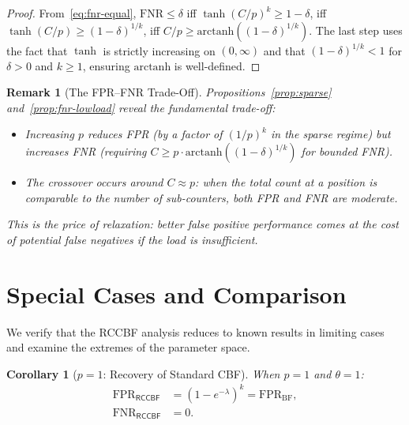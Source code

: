 \documentclass[11pt,a4paper]{article}
\newtheorem{corollary}[theorem]{Corollary}
\newtheorem{remark}[theorem]{Remark}
\newcommand{\RCCBF}{\textsf{RCCBF}}
\newcommand{\FPR}{\mathrm{FPR}}
\newcommand{\FNR}{\mathrm{FNR}}
\begin{document}
\begin{proof}
From~\eqref{eq:fnr-equal}, $\FNR \le \delta$ iff
$\tanh(C/p)^k \ge 1 - \delta$,
iff $\tanh(C/p) \ge (1-\delta)^{1/k}$,
iff $C/p \ge \mathrm{arctanh}((1-\delta)^{1/k})$.
The last step uses the fact that $\tanh$ is strictly increasing on
$(0, \infty)$ and that $(1-\delta)^{1/k} < 1$ for $\delta > 0$ and
$k \ge 1$, ensuring $\mathrm{arctanh}$ is well-defined.
\end{proof}

\begin{remark}[The FPR--FNR Trade-Off]\label{rem:tradeoff}
Propositions~\ref{prop:sparse} and~\ref{prop:fnr-lowload} reveal the
fundamental trade-off:
\begin{itemize}
  \item Increasing $p$ \emph{reduces} FPR (by a factor of $(1/p)^k$ in
        the sparse regime) but \emph{increases} FNR (requiring $C \ge p
        \cdot \mathrm{arctanh}((1-\delta)^{1/k})$ for bounded FNR).
  \item The crossover occurs around $C \approx p$: when the total count at
        a position is comparable to the number of sub-counters, both FPR
        and FNR are moderate.
\end{itemize}
This is the price of relaxation: better false positive performance comes at
the cost of potential false negatives if the load is insufficient.
\end{remark}

\section{Special Cases and Comparison}\label{sec:special}

We verify that the \RCCBF{} analysis reduces to known results in limiting
cases and examine the extremes of the parameter space.

\begin{corollary}[$p = 1$: Recovery of Standard CBF]\label{cor:p1}
When $p = 1$ and $\theta = 1$:
\begin{align}
  \FPR_{\RCCBF} &= (1 - e^{-\lambda})^k = \FPR_{\mathrm{BF}},
  \label{eq:fpr-p1} \\
  \FNR_{\RCCBF} &= 0. \label{eq:fnr-p1}
\end{align}
\end{corollary}
\end{document}

